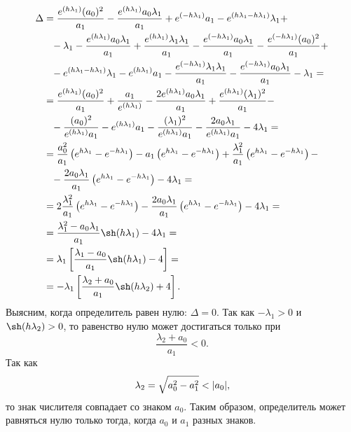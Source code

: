 \documentclass[a4paper,14pt]{article}
\theoremstyle{definition}
\begin{document}
\[
  \begin{aligned}
    \Delta
    &=
      \frac{e^{(h \lambda_1)} (a_0)^2}{a_1}
      - \frac{e^{(h \lambda_1)} a_0 \lambda_1}{a_1}
      + e^{(- h \lambda_1)} a_1
      - e^{(h \lambda_1 - h \lambda_1)} \lambda_1 + \\
    &\phantom{=}
      - \lambda_1 - \frac{e^{(h \lambda_1)} a_0 \lambda_1}{a_1}
      + \frac{e^{(h \lambda_1)} \lambda_1 \lambda_1}{a_1}
      - \frac{e^{(- h \lambda_1)} a_0 \lambda_1}{a_1}
      - \frac{e^{(- h \lambda_1)} (a_0)^2}{a_1} + \\
    &\phantom{=}
      - e^{(h \lambda_1 - h \lambda_1)} \lambda_1
      - e^{(h \lambda_1)} a_1
      - \frac{e^{(- h \lambda_1)} \lambda_1 \lambda_1}{a_1}
      - \frac{e^{(- h \lambda_1)} a_0 \lambda_1}{a_1}
      - \lambda_1 = \\
    &=
      \frac{e^{(h \lambda_1)} (a_0)^2}{a_1}
      + \frac{a_1}{e^{(h \lambda_1)}}
      - \frac{2 e^{(h \lambda_1)} a_0 \lambda_1}{a_1}
      + \frac{e^{(h \lambda_1)} (\lambda_1)^2}{a_1} - \\
    &\phantom{=}
      - \frac{(a_0)^2}{e^{(h \lambda_1)} a_1}
      - e^{(h \lambda_1)} a_1
      - \frac{(\lambda_1)^2}{e^{(h \lambda_1)} a_1}
      - \frac{2 a_0 \lambda_1}{e^{(h \lambda_1)} a_1}
      - 4 \lambda_1 = \\
    &=
      \frac{a_0^2}{a_1} \left(
      e^{h \lambda_1} - e^{-h \lambda_1}
      \right)
      - a_1 \left(
      e^{h \lambda_1} - e^{-h \lambda_1}
      \right)
      + \frac{\lambda_1^2}{a_1} \left(
      e^{h \lambda_1} - e^{-h \lambda_1}
      \right) - \\
    &\phantom{=}
      - \frac{2 a_0 \lambda_1}{a_1} \left(
      e^{h \lambda_1} - e^{-h \lambda_1}
      \right)
      - 4 \lambda_1 = \\
    &=
      2 \frac{\lambda_1^2}{a_1} \left(
      e^{h \lambda_1} - e^{-h \lambda_1}
      \right)
      - \frac{2 a_0 \lambda_1}{a_1} \left(
      e^{h \lambda_1} - e^{-h \lambda_1}
      \right)
      - 4 \lambda_1 = \\
    &=
      \frac{\lambda_1^2 - a_0 \lambda_1}{a_1}
      \sh (h \lambda_1)
      - 4 \lambda_1 = \\
    &= \lambda_1 \left[
      \frac{\lambda_1 - a_0}{a_1}
      \sh (h \lambda_1)
      - 4
      \right] = \\
    &= -\lambda_1 \left[
      \frac{\lambda_2 + a_0}{a_1}
      \sh (h \lambda_2)
      + 4
      \right].
  \end{aligned}
\]
Выясним, когда определитель равен нулю: $\Delta = 0$.
Так как $-\lambda_1 > 0$ и $\sh (h \lambda_2) > 0$, то
равенство нулю может достигаться только при
\[
  \frac{\lambda_2 + a_0}{a_1} < 0.
\]
Так как
\begin{equation*}
  \lambda_2 = \sqrt{a_0^2 - a_1^2} < \abs{a_0},
\end{equation*}
то знак числителя совпадает со знаком $a_0$. Таким образом,
определитель может равняться нулю только тогда, когда
$a_0$ и $a_1$ разных знаков.
\end{document}
